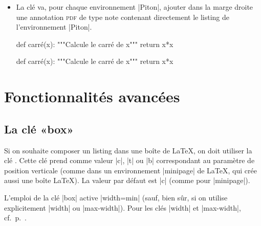 \documentclass[dvipsnames,svgnames]{article}
\begin{document}
\begin{itemize}
\medskip
\begin{Code}
\begin{Piton}[\emph{paperclip},background-color=gray!15]
def carré(x):
    """Calcule le carré de x"""
    return x*x
\end{Piton}    
\end{Code}

\medskip
\begin{Piton}[paperclip,background-color=gray!15]
def carré(x):
    """Calcule le carré de x"""
    return x*x
\end{Piton}    


\item {}
La clé  va, pour chaque environnement |{Piton}|, ajouter
dans la marge droite une annotation \textsc{pdf} de type note contenant
directement le listing de l'environnement |{Piton}|.

\medskip
\begin{Code}
\begin{Piton}[\emph{annotation},background-color=gray!15]
def carré(x):
    """Calcule le carré de x"""
    return x*x
\end{Piton}    
\end{Code}

\medskip
\begin{Piton}[annotation,background-color=gray!15]
def carré(x):
    """Calcule le carré de x"""
    return x*x
\end{Piton}    


\end{itemize}

\section{Fonctionnalités avancées}

\subsection{La clé «box»}

\label{box}


\nobreak
\smallskip
Si on souhaite composer un listing dans une boîte de LaTeX, on doit utiliser la clé
. Cette clé prend comme valeur |c|, |t| ou |b| correspondant
au paramètre de position verticale (comme dans un environnement |{minipage}| de LaTeX, qui
crée aussi une boîte LaTeX). La valeur par défaut est |c| (comme pour |{minipage}|).

\smallskip
L'emploi de la clé |box| active |width=min| (sauf, bien sûr, si on utilise
explicitement |width| ou |max-width|). Pour les clés |width| et |max-width|,
cf.~p.~\pageref{width}.
\end{document}
